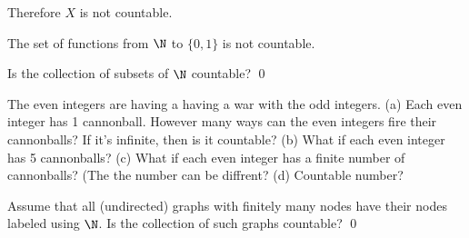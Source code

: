 Therefore $X$ is not countable.

\begin{thm}
The set of functions from $\N$ to $\{0,1\}$ is not countable.
\end{thm}

\begin{ex}
Is the collection of subsets of $\N$ countable?
\qed
\end{ex}

\begin{ex}
The even integers are having a having a war with the odd integers.
(a) Each even integer has 1 cannonball.
However many ways can the even integers fire their cannonballs?
If it's infinite, then is it countable?
(b) What if each even integer has 5 cannonballs?
(c) What if each even integer has a finite number of cannonballs?
(The the number can be diffrent?
(d) Countable number?
\end{ex}

\begin{ex}
Assume that all (undirected) graphs with finitely
many nodes have their nodes labeled using 
$\N$. 
Is the collection of such graphs countable?
\qed
\end{ex}
